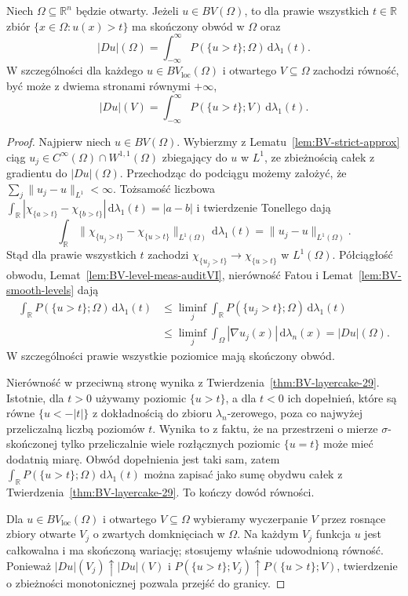 \begin{twierdzenie}
\label{thm:BV-coarea-full-29}
Niech $\Omega\subseteq\mathbb R^n$ będzie otwarty.
Jeżeli $u\in BV(\Omega)$, to dla prawie wszystkich
$t\in\mathbb R$ zbiór $\{x\in\Omega:u(x)>t\}$
ma skończony obwód w $\Omega$ oraz
\begin{equation}\label{eq:BV-coarea-full-29}
 |Du|(\Omega)=\int_{-\infty}^{\infty}
 P(\{u>t\};\Omega)\,\mathrm d\lambda_1(t).
\end{equation}
W szczególności dla każdego $u\in BV_{\mathrm{loc}}(\Omega)$
i otwartego $V\subseteq\Omega$ zachodzi równość,
być może z dwiema stronami równymi $+\infty$,
\[
 |Du|(V)=\int_{-\infty}^{\infty}
 P(\{u>t\};V)\,\mathrm d\lambda_1(t).
\]
\end{twierdzenie}
\begin{proof}
Najpierw niech $u\in BV(\Omega)$.
Wybierzmy z Lematu~\ref{lem:BV-strict-approx}
ciąg $u_j\in C^\infty(\Omega)\cap W^{1,1}(\Omega)$
zbiegający do $u$ w $L^1$, ze zbieżnością
całek z gradientu do $|Du|(\Omega)$.
Przechodząc do podciągu możemy założyć,
że $\sum_j\|u_j-u\|_{L^1}<\infty$.
Tożsamość liczbowa
$\int_{\mathbb R}|\chi_{\{a>t\}}-
\chi_{\{b>t\}}|\,\mathrm d\lambda_1(t)=|a-b|$
i twierdzenie Tonellego dają
\[
 \int_{\mathbb R}\|\chi_{\{u_j>t\}}-
 \chi_{\{u>t\}}\|_{L^1(\Omega)}
 \,\mathrm d\lambda_1(t)=\|u_j-u\|_{L^1(\Omega)}.
\]
Stąd dla prawie wszystkich $t$ zachodzi
$\chi_{\{u_j>t\}}\to\chi_{\{u>t\}}$
w $L^1(\Omega)$. Półciągłość obwodu,
Lemat~\ref{lem:BV-level-meas-auditVI},
nierówność Fatou i Lemat~\ref{lem:BV-smooth-levels}
dają
\begin{align*}
 \int_{\mathbb R}P(\{u>t\};\Omega)\,
 \mathrm d\lambda_1(t)
 &\le\liminf_j\int_{\mathbb R}
 P(\{u_j>t\};\Omega)\,\mathrm d\lambda_1(t)\\
 &\le\liminf_j\int_\Omega|\nabla u_j(x)|
 \,\mathrm d\lambda_n(x)=|Du|(\Omega).
\end{align*}
W szczególności prawie wszystkie poziomice
mają skończony obwód.

Nierówność w przeciwną stronę wynika z
Twierdzenia~\ref{thm:BV-layercake-29}.
Istotnie, dla $t>0$ używamy poziomic $\{u>t\}$,
a dla $t<0$ ich dopełnień, które są równe
$\{u<-|t|\}$ z dokładnością do zbioru
$\lambda_n$-zerowego, poza co najwyżej
przeliczalną liczbą poziomów $t$.
Wynika to z faktu, że na przestrzeni o mierze
$\sigma$-skończonej tylko przeliczalnie
wiele rozłącznych poziomic $\{u=t\}$ może
mieć dodatnią miarę. Obwód dopełnienia jest
taki sam, zatem
$\int_{\mathbb R}P(\{u>t\};\Omega)\,\mathrm d\lambda_1(t)$
można zapisać jako sumę obydwu całek
z Twierdzenia~\ref{thm:BV-layercake-29}.
To kończy dowód równości.

Dla $u\in BV_{\mathrm{loc}}(\Omega)$ i otwartego
$V\subseteq\Omega$ wybieramy wyczerpanie $V$
przez rosnące zbiory otwarte $V_j$ o zwartych
domknięciach w $\Omega$. Na każdym $V_j$
funkcja $u$ jest całkowalna i ma skończoną
wariację; stosujemy właśnie udowodnioną równość.
Ponieważ $|Du|(V_j)\uparrow|Du|(V)$
i $P(\{u>t\};V_j)\uparrow P(\{u>t\};V)$,
twierdzenie o zbieżności monotonicznej pozwala
przejść do granicy.
\end{proof}

